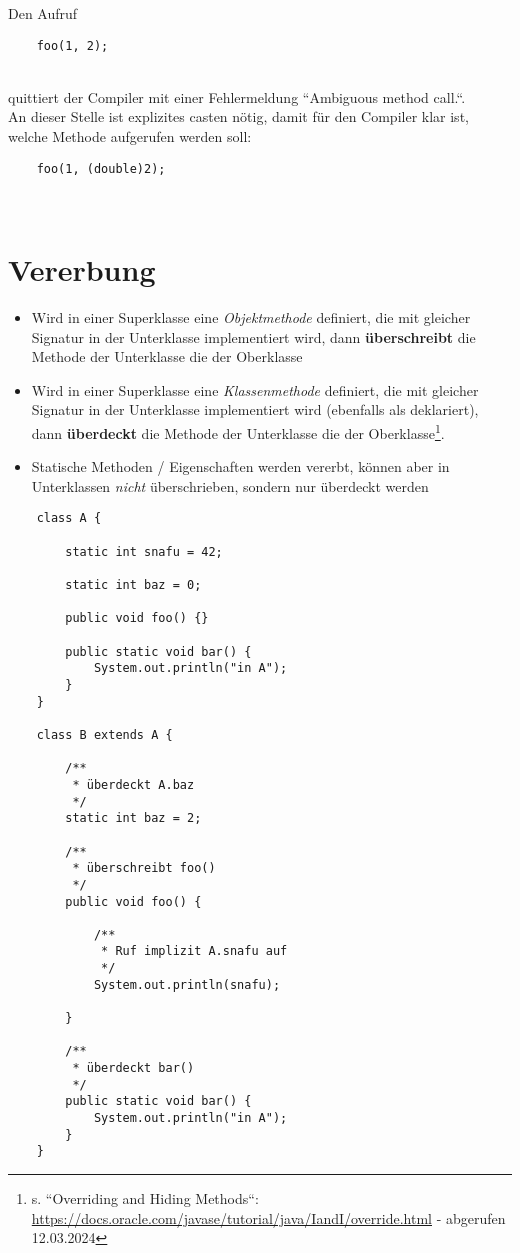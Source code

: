 Den Aufruf

\begin{verbatim}
    foo(1, 2);
\end{verbatim}\\

\noindent
quittiert der Compiler mit einer Fehlermeldung ``Ambiguous method call.``.\\
An dieser Stelle ist explizites casten nötig, damit für den Compiler klar ist, welche Methode aufgerufen werden soll:

\begin{verbatim}
    foo(1, (double)2);
\end{verbatim}\\


\section{Vererbung}

\begin{itemize}
    \item Wird in einer Superklasse eine \textit{Objektmethode} definiert, die mit gleicher Signatur in der Unterklasse implementiert wird, dann \textbf{überschreibt} die Methode der Unterklasse die der Oberklasse
    \item Wird in einer Superklasse eine \textit{Klassenmethode} definiert, die mit gleicher Signatur in der Unterklasse implementiert wird (ebenfalls als  deklariert), dann \textbf{überdeckt} die Methode der Unterklasse die der Oberklasse\footnote{
        s. ``Overriding and Hiding Methods``: \url{https://docs.oracle.com/javase/tutorial/java/IandI/override.html} - abgerufen 12.03.2024
    }.
    \item Statische Methoden / Eigenschaften werden vererbt, können aber in Unterklassen \textit{nicht} überschrieben, sondern nur überdeckt werden
\end{itemize}

\begin{verbatim}
    class A {

        static int snafu = 42;

        static int baz = 0;

        public void foo() {}

        public static void bar() {
            System.out.println("in A");
        }
    }

    class B extends A {

        /**
         * überdeckt A.baz
         */
        static int baz = 2;

        /**
         * überschreibt foo()
         */
        public void foo() {

            /**
             * Ruf implizit A.snafu auf
             */
            System.out.println(snafu);

        }

        /**
         * überdeckt bar()
         */
        public static void bar() {
            System.out.println("in A");
        }
    }
\end{verbatim}
